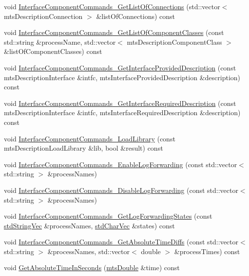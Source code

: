 \begin{DoxyCompactItemize}
\item 
void \hyperlink{classmts_manager_component_client_a551017574e04ac9cc7eb2f0430ba573e}{Interface\+Component\+Commands\+\_\+\+Get\+List\+Of\+Connections} (std\+::vector$<$ mts\+Description\+Connection $>$ \&list\+Of\+Connections) const 
\item 
void \hyperlink{classmts_manager_component_client_a84f16e0e7370e527e27b3e5ffc70d939}{Interface\+Component\+Commands\+\_\+\+Get\+List\+Of\+Component\+Classes} (const std\+::string \&process\+Name, std\+::vector$<$ mts\+Description\+Component\+Class $>$ \&list\+Of\+Component\+Classes) const 
\item 
void \hyperlink{classmts_manager_component_client_a824e945df9294a5f0d2232bac4e94d22}{Interface\+Component\+Commands\+\_\+\+Get\+Interface\+Provided\+Description} (const mts\+Description\+Interface \&intfc, mts\+Interface\+Provided\+Description \&description) const 
\item 
void \hyperlink{classmts_manager_component_client_ad50e56091dc851539a7e8fc476c0a4f2}{Interface\+Component\+Commands\+\_\+\+Get\+Interface\+Required\+Description} (const mts\+Description\+Interface \&intfc, mts\+Interface\+Required\+Description \&description) const 
\item 
void \hyperlink{classmts_manager_component_client_a57f8645c0a6863afe5de2015663ed56e}{Interface\+Component\+Commands\+\_\+\+Load\+Library} (const mts\+Description\+Load\+Library \&lib, bool \&result) const 
\item 
void \hyperlink{classmts_manager_component_client_a0f18b0ca5e0033d8b79d3c122cabfc34}{Interface\+Component\+Commands\+\_\+\+Enable\+Log\+Forwarding} (const std\+::vector$<$ std\+::string $>$ \&process\+Names)
\item 
void \hyperlink{classmts_manager_component_client_ae1414f75a81804aef52ebb98fd57ffb4}{Interface\+Component\+Commands\+\_\+\+Disable\+Log\+Forwarding} (const std\+::vector$<$ std\+::string $>$ \&process\+Names)
\item 
void \hyperlink{classmts_manager_component_client_ae2718770ec2d7fe575827ef2fe3021d9}{Interface\+Component\+Commands\+\_\+\+Get\+Log\+Forwarding\+States} (const \hyperlink{mts_generic_object_proxy_8h_ae2238149254430b4959aa4e16892fc07}{std\+String\+Vec} \&process\+Names, \hyperlink{mts_generic_object_proxy_8h_a3fcb43cabc338a5aee6772138bee2416}{std\+Char\+Vec} \&states) const 
\item 
void \hyperlink{classmts_manager_component_client_ae7eea9db98c4c4075089dd526f632c02}{Interface\+Component\+Commands\+\_\+\+Get\+Absolute\+Time\+Diffs} (const std\+::vector$<$ std\+::string $>$ \&process\+Names, std\+::vector$<$ double $>$ \&process\+Times) const 
\item 
void \hyperlink{classmts_manager_component_client_a28c83b829432326cc4fe6bcd340a7b17}{Get\+Absolute\+Time\+In\+Seconds} (\hyperlink{mts_generic_object_proxy_8h_a31e76b0190a8d3f9838626cd7b47bd75}{mts\+Double} \&time) const 
\end{DoxyCompactItemize}
